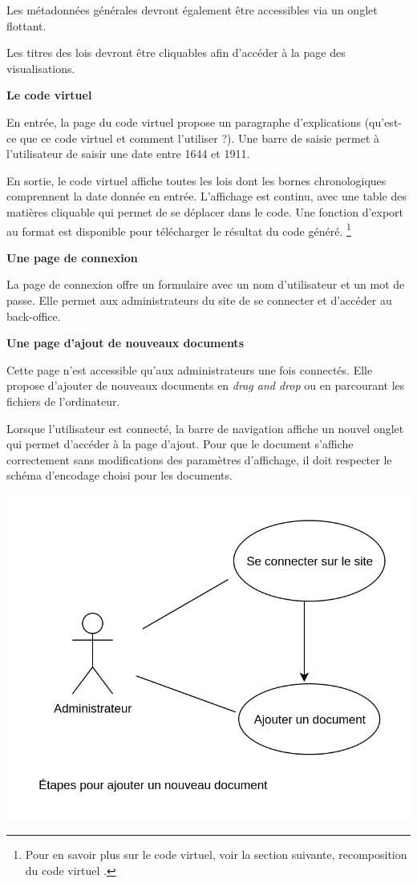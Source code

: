 Les métadonnées générales devront également être accessibles via un onglet flottant. 

Les titres des lois devront être cliquables afin d’accéder à la page des visualisations.

\bigskip
\textbf{Le code virtuel}

En entrée, la page du code virtuel propose un paragraphe d’explications (qu’est-ce que ce code virtuel et comment l’utiliser ?). Une barre de saisie permet à l’utilisateur de saisir une date entre 1644 et 1911. 

En sortie, le code virtuel affiche toutes les lois dont les bornes chronologiques comprennent la date donnée en entrée. L’affichage est continu, avec une table des matières cliquable qui permet de se déplacer dans le code. Une fonction d’export au format \pdf est disponible pour télécharger le résultat du code généré. \footnote{Pour en savoir plus sur le code virtuel, voir la section suivante, \og recomposition du code virtuel \fg.}

\newpage
\textbf{Une page de connexion}

La page de connexion offre un formulaire avec un nom d’utilisateur et un mot de passe. Elle permet aux administrateurs du site de se connecter et d’accéder au back-office. 

\bigskip
\textbf{Une page d'ajout de nouveaux documents}

Cette page n’est accessible qu’aux administrateurs une fois connectés. Elle propose d’ajouter de nouveaux documents en \textit{drag and drop} ou en parcourant les fichiers de l’ordinateur. 

Lorsque l’utilisateur est connecté, la barre de navigation affiche un nouvel onglet qui permet d’accéder à la page d’ajout. Pour que le document s’affiche correctement sans modifications des paramètres d’affichage, il doit respecter le schéma d’encodage choisi pour les documents.

\noindent \includegraphics[width=\textwidth]{images/annexe7.png}

